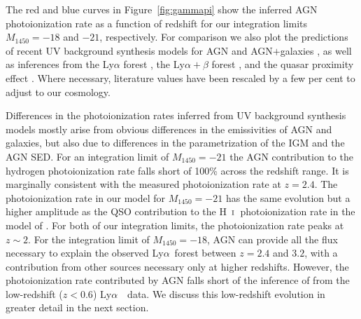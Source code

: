 \documentclass[fleqn,usenatbib]{mnras}
\def\lya{Ly$\alpha$~}
\def\HI{\hbox{H~$\scriptstyle\rm I$}}
\begin{document}
The red and blue curves in Figure~\ref{fig:gammapi} show the inferred
AGN  photoionization rate as a function of redshift for our
integration limits $M_{1450}=-18$ and $-21$, respectively. For
comparison we also plot the predictions of recent UV background
synthesis models for AGN
\citep{2012ApJ...746..125H,2015ApJ...813L...8M,2015MNRAS.451L..30K}
and AGN$+$galaxies \citep{2012ApJ...746..125H,2018arXiv180104931P}, as
well as inferences from the  Ly$\alpha$ forest
\citep{2011MNRAS.412.1926W,2013MNRAS.436.1023B,2017MNRAS.467.3172G,2018MNRAS.473..560D},
the Ly$\alpha+\beta$ forest \citep{2018ApJ...855..106D}, and the
quasar proximity effect \citep{2011MNRAS.412.2543C}.  Where necessary,
literature values have been rescaled by a few per cent to adjust to
our cosmology.

Differences in the  photoionization rates inferred from UV
background synthesis models mostly arise from obvious differences in
the emissivities of AGN and galaxies, but also due to differences in
the parametrization of the IGM and the AGN SED.  For an integration
limit of $M_{1450}=-21$ the AGN contribution to the hydrogen
photoionization rate falls short of 100\% across the redshift range.
It is marginally consistent with the measured photoionization rate at
$z=2.4$.  The photoionization rate in our model for $M_{1450}=-21$ has
the same evolution but a higher amplitude as the QSO contribution to
the \HI\ photoionization rate in the model of
\citet{2012ApJ...746..125H}.  For both of our integration limits, the
photoionization rate peaks at $z\sim 2$.  For the integration limit of
$M_{1450}=-18$, AGN can provide all the flux necessary to explain the
observed \lya forest between $z=2.4$ and $3.2$, with a contribution
from other sources necessary only at higher redshifts.  However, the
photoionization rate contributed by AGN falls short of the inference
of \citet{2017MNRAS.467.3172G} from the low-redshift ($z<0.6$)
\lya\ data.  We discuss this low-redshift evolution in greater detail
in the next section.
\end{document}
